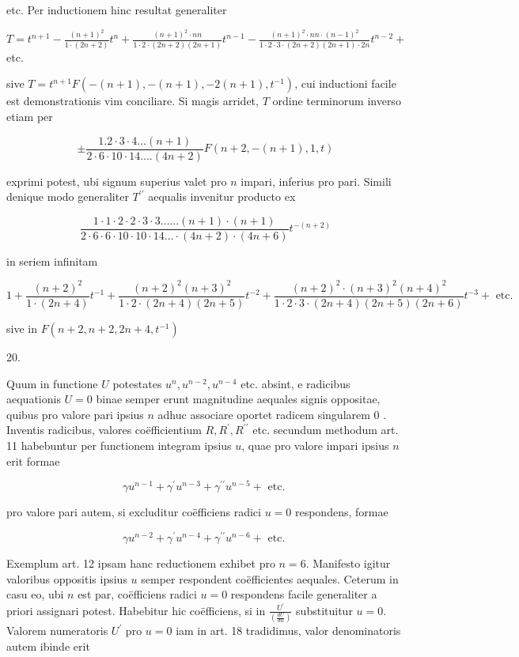 \documentclass[10pt]{article}
\begin{document}
etc. Per inductionem hinc resultat generaliter

\(T=t^{n+1}-\frac{(n+1)^{2}}{1 \cdot(2 n+2)} t^{n}+\frac{(n+1)^{2} \cdot n n}{1 \cdot 2 \cdot(2 n+2)(2 n+1)} t^{n-1}-\frac{(n+1)^{2} \cdot n n \cdot(n-1)^{2}}{1 \cdot 2 \cdot 3 \cdot(2 n+2)(2 n+1) \cdot 2 n} t^{n-2}+\) etc.

sive \(T=t^{n+1} F\left(-(n+1),-(n+1),-2(n+1), t^{-1}\right)\), cui inductioni facile est demonstrationis vim conciliare. Si magis arridet, \(T\) ordine terminorum inverso etiam per

\[
\pm \frac{1.2 \cdot 3 \cdot 4 \ldots(n+1)}{2 \cdot 6 \cdot 10 \cdot 14 \ldots .(4 n+2)} F(n+2,-(n+1), 1, t)
\]

exprimi potest, ubi signum superius valet pro \(n\) impari, inferius pro pari. Simili denique modo generaliter \(T^{\prime \prime}\) aequalis invenitur producto ex

\[
\frac{1 \cdot 1 \cdot 2 \cdot 2 \cdot 3 \cdot 3 \ldots \ldots(n+1) \cdot(n+1)}{2 \cdot 6 \cdot 6 \cdot 10 \cdot 10 \cdot 14 \ldots \cdot(4 n+2) \cdot(4 n+6)} t^{-(n+2)}
\]

in seriem infinitam

\[
1+\frac{(n+2)^{2}}{1 \cdot(2 n+4)} t^{-1}+\frac{(n+2)^{2}(n+3)^{2}}{1 \cdot 2 \cdot(2 n+4)(2 n+5)} t^{-2}+\frac{(n+2)^{2} \cdot(n+3)^{2}(n+4)^{2}}{1 \cdot 2 \cdot 3 \cdot(2 n+4)(2 n+5)(2 n+6)} t^{-3}+\text { etc. }
\]

sive in \(F\left(n+2, n+2,2 n+4, t^{-1}\right)\)

20.

Quum in functione \(U\) potestates \(u^{n}, u^{n-2}, u^{n-4}\) etc. absint, e radicibus aequationis \(U=0\) binae semper erunt magnitudine aequales signis oppositae, quibus pro valore pari ipsius \(n\) adhuc associare oportet radicem singularem 0 . Inventis radicibus, valores coëfficientium \(R, R^{\prime}, R^{\prime \prime}\) etc. secundum methodum art. 11 habebuntur per functionem integram ipsius \(u\), quae pro valore impari ipsius \(n\) erit formae

\[
\gamma u^{n-1}+\gamma^{\prime} u^{n-3}+\gamma^{\prime \prime} u^{n-5}+\text { etc. }
\]

pro valore pari autem, si excluditur coëfficiens radici \(u=0\) respondens, formae

\[
\gamma u^{n-2}+\gamma^{\prime} u^{n-4}+\gamma^{\prime \prime} u^{n-6}+\text { etc. }
\]

Exemplum art. 12 ipsam hanc reductionem exhibet pro \(n=6\). Manifesto igitur valoribus oppositis ipsius \(u\) semper respondent coëfficientes aequales. Ceterum in casu eo, ubi \(n\) est par, coëfficiens radici \(u=0\) respondens facile generaliter a priori assignari potest. Habebitur hic coëfficiens, si in \(\frac{U^{\prime}}{\left(\frac{d U}{d u}\right)}\) substituitur \(u=0\). Valorem numeratoris \(U^{\prime}\) pro \(u=0\) iam in art. 18 tradidimus, valor denominatoris autem ibinde erit
\end{document}
